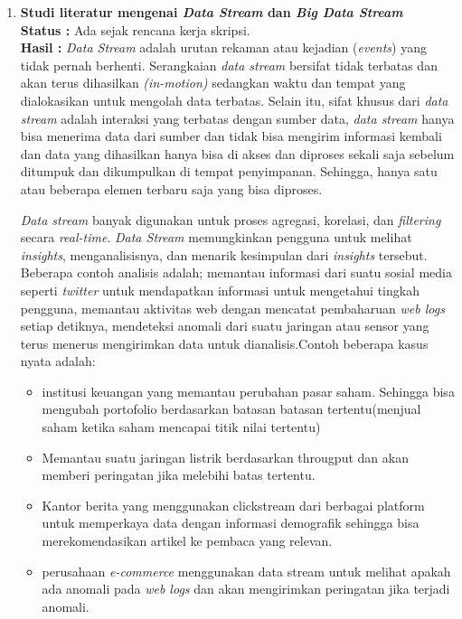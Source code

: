 \documentclass[a4paper,twoside]{article}
\begin{document}
\begin{enumerate}
		\item \textbf{Studi literatur mengenai \textit{Data Stream} dan \textit{Big Data Stream}}\\
		{\bf Status :} Ada sejak rencana kerja skripsi.\\
		{\bf Hasil :} \textit{Data Stream} adalah urutan rekaman atau kejadian (\textit{events})
		yang tidak pernah berhenti. Serangkaian \textit{data stream} bersifat tidak terbatas dan 				akan terus dihasilkan \textit{(in-motion)} sedangkan waktu dan tempat yang dialokasikan 				untuk mengolah data terbatas. Selain itu, sifat khusus dari \textit{data stream} adalah 				interaksi yang terbatas dengan sumber data, \textit{data stream} hanya bisa menerima data 				dari sumber dan tidak bisa mengirim informasi kembali dan data yang dihasilkan hanya bisa di 		akses dan diproses sekali saja sebelum ditumpuk dan dikumpulkan di tempat penyimpanan. 					Sehingga, hanya satu atau beberapa elemen terbaru saja yang bisa diproses. 
		
		\textit{Data stream} banyak digunakan untuk proses agregasi, korelasi, dan 								\textit{filtering} secara \textit{real-time}. 
		\textit{Data Stream} memungkinkan pengguna untuk melihat \textit{insights}, menganalisisnya, 
		dan menarik kesimpulan dari \textit{insights} tersebut. Beberapa contoh analisis adalah; 
		memantau informasi dari suatu sosial media seperti \textit{twitter} untuk mendapatkan 
		informasi untuk mengetahui tingkah pengguna, memantau aktivitas web dengan 
		mencatat pembaharuan \textit{web logs} setiap detiknya, mendeteksi anomali 
		dari suatu jaringan atau sensor yang terus menerus mengirimkan 	data untuk 
		dianalisis.Contoh beberapa kasus nyata adalah:
		\begin{itemize}
		\item institusi keuangan yang memantau perubahan pasar saham. Sehingga bisa mengubah
		portofolio berdasarkan batasan batasan tertentu(menjual saham ketika saham
		mencapai titik nilai tertentu)
		\item Memantau suatu jaringan listrik berdasarkan througput dan akan memberi peringatan
		jika melebihi batas tertentu.
		\item Kantor berita yang menggunakan clickstream dari berbagai platform untuk memperkaya
		data dengan informasi demografik sehingga bisa merekomendasikan artikel ke pembaca
		yang relevan.
		\item perusahaan \textit{e-commerce} menggunakan data stream untuk melihat apakah ada
		anomali pada \textit{web logs} dan akan mengirimkan peringatan jika terjadi anomali.
		\end{itemize}
		

\end{enumerate}
\end{document}
